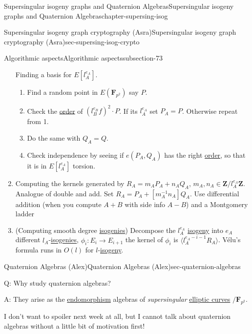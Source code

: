 \documentclass[oneside,10pt,]{book}
\numberwithin{equation}{section}
\newcommand{\inv}{^{-1}}
\newcommand{\lb}{[}
\newcommand{\rb}{]}
\newcommand{\ZZ}{\mathbf{Z}}
\newcommand{\FF}{\mathbf{F}}
\begin{document}
\begin{chapterptx}{Supersingular isogeny graphs and Quaternion Algebras}{}{Supersingular isogeny graphs and Quaternion Algebras}{}{}{chapter-supersing-isog}
\begin{sectionptx}{Supersingular isogeny graph cryptography (Asra)}{}{Supersingular isogeny graph cryptography (Asra)}{}{}{sec-supersing-isog-crypto}
\begin{subsectionptx}{Algorithmic aspects}{}{Algorithmic aspects}{}{}{subsection-73}
\begin{enumerate}
Finding a basis for \(E\lb l_A^{e_A}\rb\).%
\begin{enumerate}
\item\hypertarget{li-221}{}Find a random point in \(E(\FF_{p^2})\) say \(P\).%
\item\hypertarget{li-222}{}Check the \hyperref[def-order-quaternion]{order} of \((l_B^{e_B} f)^2 \cdot P\). If its \(l_A^{e_A}\) set \(P_A = P\). Otherwise repeat from 1.%
\item\hypertarget{li-223}{}Do the same with \(Q_A = Q\).%
\item\hypertarget{li-224}{}Check independence by seeing if \(e(P_A,Q_A) \) has the right \hyperref[def-order-quaternion]{order}, so that it is in \(E\lb l_A^{e_A} \rb\) torsion.%
\end{enumerate}
%
\item\hypertarget{li-225}{}Computing the kernels generated by \(R_A = m_A P_A + n_A Q_A\), \(m_A, n_A \in \ZZ/l_A^{e_A} \ZZ\). Analogue of double and add. Set \(R_A = P_A + \lb m_A\inv n_A\rb Q_A\). Use differential addition (when you compute \(A+B\) with side info \(A-B\)) and a Montgomery ladder%
\item\hypertarget{li-226}{}(Computing smooth degree \hyperref[def-supersing-isog-isog]{isogenies}) Decompose the \(l_A^{e_A}\) \hyperref[def-supersing-isog-isog]{isogeny} into \(e_A\) different \(l_A\)-\hyperref[def-supersing-isog-isog]{isogenies}, \(\phi_i\colon E_i \to E_{i+1}\) the kernel of \(\phi_i\) is \(\langle l_A^{e_A - i - 1} R_A\rangle\). Vélu's formula runs in \(O(l)\) for \(l\)-\hyperref[def-supersing-isog-isog]{isogeny}.%
\end{enumerate}
%
\end{subsectionptx}
\end{sectionptx}
%
%
\typeout{************************************************}
\typeout{************************************************}
%
\begin{sectionptx}{Quaternion Algebras (Alex)}{}{Quaternion Algebras (Alex)}{}{}{sec-quaternion-algebras}
\begin{introduction}{}%
\hypertarget{p-865}{}%
Q: Why study quaternion algebras?%
\par
\hypertarget{p-866}{}%
A: They arise as the \hyperref[def-supersing-isog-endo]{endomorphism} algebras of \emph{supersingular} \hyperref[def-supersing-isog-ec]{elliptic curves} \(/\FF_{p^2}\).%
\par
\hypertarget{p-867}{}%
I don't want to spoiler next week at all, but I cannot talk about quaternion algebras without a little bit of motivation first!%

\end{introduction}
\end{sectionptx}
\end{chapterptx}
\end{document}
